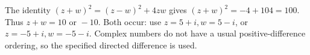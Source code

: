 The identity $(z+w)^2=(z-w)^2+4zw$ gives $(z+w)^2=-4+104=100$. Thus $\boxed{z+w=10\text{ or }-10}$. Both occur: use $z=5+i,w=5-i$, or $z=-5+i,w=-5-i$. Complex numbers do not have a usual positive-difference ordering, so the specified directed difference is used.
